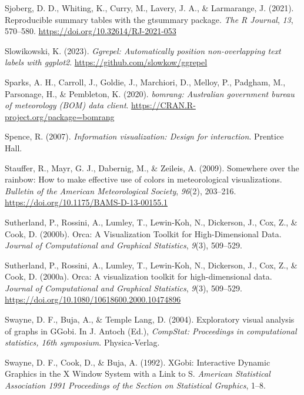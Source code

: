 \documentclass[
  letterpaper,
]{krantz}
\newlength{\cslhangindent}
\newlength{\cslentryspacingunit} %
\newenvironment{CSLReferences}[2] %
 {%
  \setlength{\parindent}{0pt}
  \ifodd #1
  \let\oldpar\par
  \def\par{\hangindent=\cslhangindent\oldpar}
  \fi
  \setlength{\parskip}{#2\cslentryspacingunit}
 }%
 {}
\begin{document}
\begin{CSLReferences}{1}{0}
\leavevmode{}%
Sjoberg, D. D., Whiting, K., Curry, M., Lavery, J. A., \& Larmarange, J.
(2021). Reproducible summary tables with the gtsummary package.
\emph{{The R Journal}}, \emph{13}, 570--580.
\url{https://doi.org/10.32614/RJ-2021-053}

\leavevmode{}%
Slowikowski, K. (2023). \emph{Ggrepel: Automatically position
non-overlapping text labels with ggplot2}.
\url{https://github.com/slowkow/ggrepel}

\leavevmode{}%
Sparks, A. H., Carroll, J., Goldie, J., Marchiori, D., Melloy, P.,
Padgham, M., Parsonage, H., \& Pembleton, K. (2020). \emph{{bomrang}:
Australian government bureau of meteorology (BOM) data client}.
\url{https://CRAN.R-project.org/package=bomrang}

\leavevmode{}%
Spence, R. (2007). \emph{Information visualization: Design for
interaction}. Prentice Hall.

\leavevmode{}%
Stauffer, R., Mayr, G. J., Dabernig, M., \& Zeileis, A. (2009).
Somewhere over the rainbow: How to make effective use of colors in
meteorological visualizations. \emph{Bulletin of the American
Meteorological Society}, \emph{96}(2), 203--216.
\url{https://doi.org/10.1175/BAMS-D-13-00155.1}

\leavevmode{}%
Sutherland, P., Rossini, A., Lumley, T., Lewin-Koh, N., Dickerson, J.,
Cox, Z., \& Cook, D. (2000b). Orca: {A} {V}isualization {T}oolkit for
{H}igh-{D}imensional {D}ata. \emph{Journal of Computational and
Graphical Statistics}, \emph{9}(3), 509--529.

\leavevmode{}%
Sutherland, P., Rossini, A., Lumley, T., Lewin-Koh, N., Dickerson, J.,
Cox, Z., \& Cook, D. (2000a). Orca: A visualization toolkit for
high-dimensional data. \emph{Journal of Computational and Graphical
Statistics}, \emph{9}(3), 509--529.
\url{https://doi.org/10.1080/10618600.2000.10474896}

\leavevmode{}%
Swayne, D. F., Buja, A., \& Temple Lang, D. (2004). Exploratory visual
analysis of graphs in {GG}obi. In J. Antoch (Ed.), \emph{CompStat:
Proceedings in computational statistics, 16th symposium}.
Physica-Verlag.

\leavevmode{}%
Swayne, D. F., Cook, D., \& Buja, A. (1992). {XG}obi: {I}nteractive
{D}ynamic {G}raphics in the {X} {W}indow {S}ystem with a {L}ink to {S}.
\emph{American Statistical Association 1991 Proceedings of the Section
on Statistical Graphics}, 1--8.


\end{CSLReferences}
\end{document}
